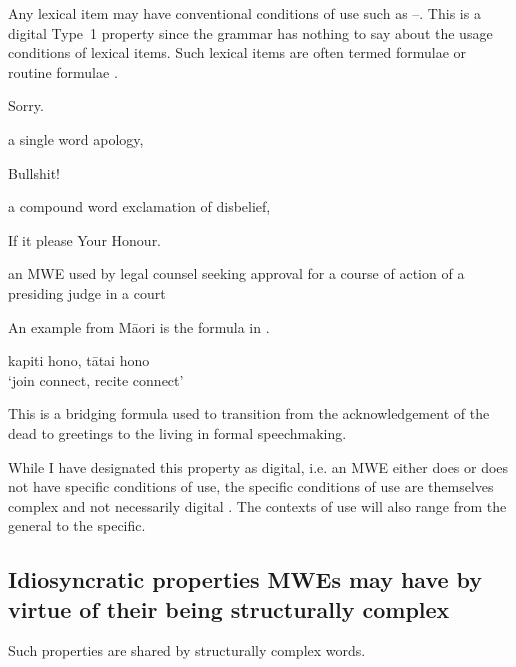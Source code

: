 \documentclass[output=paper]{langsci/langscibook}
\begin{document}
Any lexical item may have conventional conditions of use such as --. This is a digital Type~1 property since the grammar has nothing to say about the usage conditions of lexical items. Such lexical items are often termed formulae or routine formulae  \citep{Coulmas1979}.

\begin{exe}
\ex\label{ex:ex09} Sorry.
\end{exe}

\noindent
a single word apology,

\begin{exe}
\ex\label{ex:ex10} Bullshit!
\end{exe}

\noindent
a compound word exclamation of disbelief,

\begin{exe}
\ex\label{ex:ex11} If it please Your Honour.
\end{exe}

\noindent
an MWE used by legal counsel seeking approval for a course of action of a presiding judge in a court

An example from M\=aori is the formula in . 


\begin{exe}
\ex\label{ex:ex12} kapiti hono,       t\=atai   hono\\
‘join   connect,  recite connect’
\end{exe}

\noindent
This is a bridging formula used to transition from the acknowledgement of the dead to greetings to the living in formal speechmaking.

While %
I have designated this property as digital, i.e. an MWE either does or does not have specific 
conditions of use, the specific conditions of use are themselves complex and not necessarily 
digital \citep{Biber1994}. The contexts of use will also range from the general to the specific. 

\subsection{Idiosyncratic properties MWEs may have by virtue of their being structurally complex}

Such properties are shared by structurally complex words.
\end{document}
